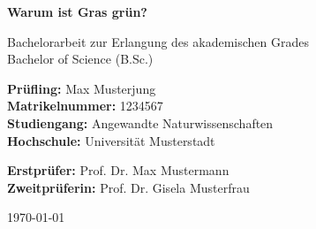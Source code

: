 
\begin{titlepage}
    \centering
    \vspace*{2cm}

    {\LARGE\textbf{Warum ist Gras grün?}\par}
    \vspace{2cm}

    {\large Bachelorarbeit zur Erlangung des akademischen Grades\\
    Bachelor of Science (B.Sc.)\par}
    \vspace{2cm}

    \begin{flushleft}
        \textbf{Prüfling:} Max Musterjung\\
        \textbf{Matrikelnummer:} 1234567\\
        \textbf{Studiengang:} Angewandte Naturwissenschaften\\
        \textbf{Hochschule:} Universität Musterstadt
    \end{flushleft}

    \vfill

    \begin{center}
        \textbf{Erstprüfer:} Prof. Dr. Max Mustermann\\
        \textbf{Zweitprüferin:} Prof. Dr. Gisela Musterfrau
    \end{center}

    \vspace{1cm}
    {\large \today\par}
\end{titlepage}
